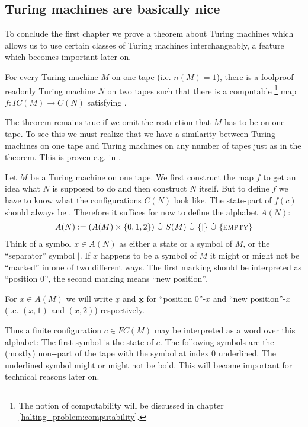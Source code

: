 \subsection{Turing machines are basically nice}

To conclude the first chapter we prove a theorem about Turing machines which allows us to use certain classes of Turing machines interchangeably, a feature which becomes important later on.
\begin{Theorem}
	\label{turing_machines:main_theorem:theorem}
	For every Turing machine $M$ on one tape (i.e. $n(M) = 1$), there is a foolproof readonly Turing machine $N$ on two tapes such that
	there is a computable
	\footnote{The notion of computability will be discussed in chapter \ref{halting_problem:computability}.}
	map $f: IC(M) \to C(N)$
	satisfying .\footnotemark
\end{Theorem}
\begin{Remark}
	The theorem remains true if we omit the restriction that $M$ has to be on one tape. To see this we must realize that we have a similarity between Turing machines on one tape and Turing machines on any number of tapes just as in the theorem. This is proven e.g. in \cite{sip06}.
\end{Remark}
\proof
	Let $M$ be a Turing machine on one tape.
	We first construct the map $f$ to get an idea what $N$ is supposed to do and then construct $N$ itself.
	But to define $f$ we have to know what the configurations $C(N)$ look like.
	The state-part of $f(c)$ should always be \INI. Therefore it suffices for now to define the alphabet $A(N)$:
	\begin{align*}
		A(N) := (A(M) \times \{0,1,2\})~\dot\cup~S(M)~\dot\cup~\{|\}~\dot\cup~\{\text{\scshape{empty}}\}
	\end{align*}
	Think of a symbol $x \in A(N)$ as either a state or a symbol of $M$, or the ``separator'' symbol $|$.
	If $x$ happens to be a symbol of $M$ it might or might not be ``marked'' in one of two different ways.
	The first marking should be interpreted as ``position $0$'', the second marking means ``new position''.

	For $x \in A(M)$ we will write
	$\underline{x}$ and $\underline{\boldsymbol{x}}$ for ``position $0$''-$x$ and ``new position''-$x$ (i.e. $(x,1)$ and $(x,2)$) respectively.

	Thus a finite configuration $c \in FC(M)$ may be interpreted as a word over this alphabet:
	The first symbol is the state of $c$. The following symbols are the (mostly) non-\EMP-part of the tape with the symbol at index $0$ underlined.
	The underlined symbol might or might not be bold. This will become important for technical reasons later on.

